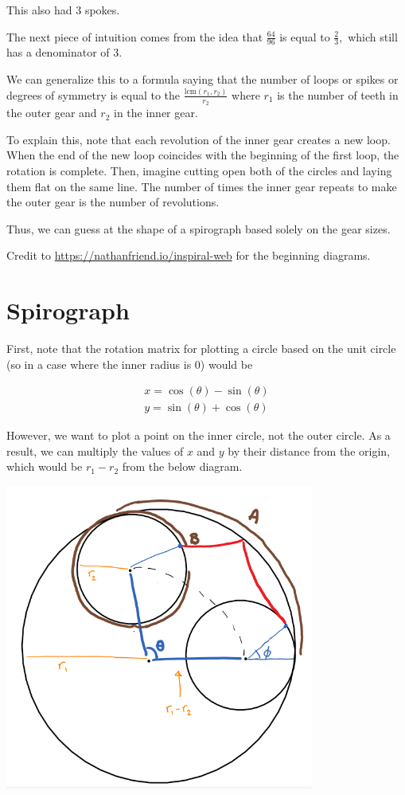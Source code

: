 \documentclass{article}
\begin{document}
This also had $3$ spokes. 

The next piece of intuition comes from the idea that $\frac{64}{96}$ is equal to $\frac{2}{3},$ which still has a denominator of $3.$

We can generalize this to a formula saying that the number of loops or spikes or degrees of symmetry is equal to the $\frac{\text{lcm}(r_1, r_2)}{r_2}$ where $r_1$ is the number of teeth in the outer gear and $r_2$ in the inner gear.

To explain this, note that each revolution of the inner gear creates a new loop. When the end of the new loop coincides with the beginning of the first loop, the rotation is complete. Then, imagine cutting open both of the circles and laying them flat on the same line. The number of times the inner gear repeats to make the outer gear is the number of revolutions. 

Thus, we can guess at the shape of a spirograph based solely on the gear sizes. 

Credit to \url{https://nathanfriend.io/inspiral-web} for the beginning diagrams.

\section{Spirograph}

First, note that the rotation matrix for plotting a circle based on the unit circle (so in a case where the inner radius is $0$) would be 

\begin{align*}
    x = \cos(\theta) - \sin(\theta) \\
    y = \sin(\theta) + \cos(\theta)
\end{align*}

However, we want to plot a point on the inner circle, not the outer circle. As a result, we can multiply the values of $x$ and $y$ by their distance from the origin, which would be $r_1 - r_2$ from the below diagram. 

\begin{center}
\includegraphics[width=4in]{images/Angle Diagram (1).png}
\end{center}
\end{document}
